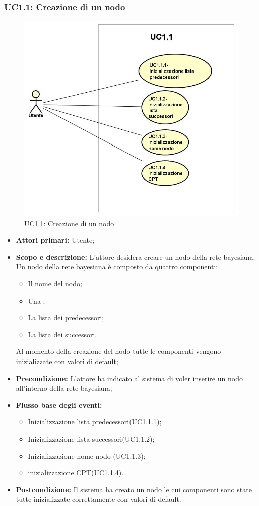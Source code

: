 \subsubsection{UC1.1: Creazione di un nodo} 
\begin{figure} [H]
	\centering
	\includegraphics[scale=0.45]{Img/UC1-1} 
	\caption{UC1.1: Creazione di un nodo} \label{} 
\end{figure} 
\begin{itemize} 
	\item{\textbf{Attori primari:} Utente;} 
	\item{\textbf{Scopo e descrizione:} L'attore desidera creare un nodo della rete bayesiana. Un nodo della rete bayesiana è composto da quattro componenti: 
	\begin{itemize} 
		\item{Il nome del nodo;} 
		\item{Una ;} 
		\item{La lista dei predecessori;} 
		\item{La lista dei successori.} 
	\end{itemize} 
Al momento della creazione del nodo tutte le componenti vengono inizializzate con valori di default;} 
	\item{\textbf{Precondizione:} L'attore ha indicato al sistema di voler inserire un nodo all'interno della rete bayesiana;} 
	\item{\textbf{Flusso base degli eventi:} } 
		\begin{itemize} 
			\item{Inizializzazione lista predecessori(UC1.1.1);} 
			\item{Inizializzazione lista successori(UC1.1.2);} 
			\item{Inizializzazione nome nodo (UC1.1.3);} 
			\item{inizializzazione CPT(UC1.1.4).} 
		\end{itemize} 
	\item{\textbf{Postcondizione:} Il sistema ha creato un nodo le cui componenti sono state tutte inizializzate correttamente con valori di default.} 
\end{itemize} 
